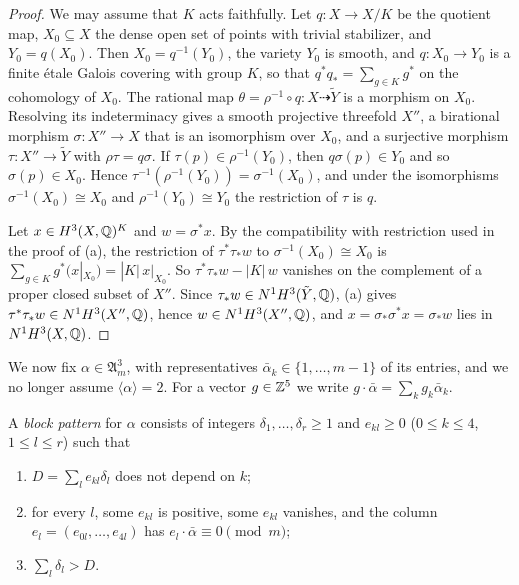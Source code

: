 \begin{proof}
We may assume that $K$ acts faithfully. Let $q\colon X\to X/K$ be the
quotient map, $X_{0}\subseteq X$ the dense open set of points with trivial
stabilizer, and $Y_{0}=q(X_{0})$. Then $X_{0}=q^{-1}(Y_{0})$, the variety
$Y_{0}$ is smooth, and $q\colon X_{0}\to Y_{0}$ is a finite \'etale Galois
covering with group $K$, so that $q^{*}q_{*}=\sum_{g\in K}g^{*}$ on the
cohomology of $X_{0}$. The rational map $\theta=\rho^{-1}\circ q\colon
X\dashrightarrow\tilde Y$ is a morphism on $X_{0}$. Resolving its
indeterminacy \cite{Hir64} gives a smooth projective threefold $X''$, a
birational morphism $\sigma\colon X''\to X$ that is an isomorphism over
$X_{0}$, and a surjective morphism $\tau\colon X''\to\tilde Y$ with
$\rho\tau=q\sigma$. If $\tau(p)\in\rho^{-1}(Y_{0})$, then $q\sigma(p)\in
Y_{0}$ and so $\sigma(p)\in X_{0}$. Hence $\tau^{-1}(\rho^{-1}(Y_{0}))=
\sigma^{-1}(X_{0})$, and under the isomorphisms $\sigma^{-1}(X_{0})\cong
X_{0}$ and $\rho^{-1}(Y_{0})\cong Y_{0}$ the restriction of $\tau$ is $q$.

Let $x\in H^{3}(X,\mathbb{Q})^{K}$ and $w=\sigma^{*}x$. By the compatibility with
restriction used in the proof of (a), the restriction of
$\tau^{*}\tau_{*}w$ to $\sigma^{-1}(X_{0})\cong X_{0}$ is
$\sum_{g\in K}g^{*}(x|_{X_{0}})=|K|\,x|_{X_{0}}$. So $\tau^{*}\tau_{*}w-
|K|\,w$ vanishes on the complement of a proper closed subset of $X''$. Since
$\tau_{*}w\in N^{1}H^{3}(\tilde Y,\mathbb{Q})$, (a) gives
$\tau^{*}\tau_{*}w\in N^{1}H^{3}(X'',\mathbb{Q})$, hence $w\in N^{1}H^{3}(X'',\mathbb{Q})$,
and $x=\sigma_{*}\sigma^{*}x=\sigma_{*}w$ lies in $N^{1}H^{3}(X,\mathbb{Q})$.
\end{proof}

We now fix $\alpha\in\mathfrak A^{3}_{m}$, with representatives
$\bar\alpha_{k}\in\{1,\dots,m-1\}$ of its entries, and we no longer assume
$\langle\alpha\rangle=2$. For a vector $g\in\mathbb{Z}^{5}$ we write $g\cdot
\bar\alpha=\sum_{k}g_{k}\bar\alpha_{k}$.

\begin{definition}\label{def:blockpattern}
A \emph{block pattern} for $\alpha$ consists of integers $\delta_{1},\dots,
\delta_{r}\ge1$ and $e_{kl}\ge0$ ($0\le k\le4$, $1\le l\le r$) such that
\begin{enumerate}[label=\textup{(P\arabic*)}]
\item $D=\sum_{l}e_{kl}\delta_{l}$ does not depend on $k$;
\item for every $l$, some $e_{kl}$ is positive, some $e_{kl}$ vanishes, and
the column $e_{l}=(e_{0l},\dots,e_{4l})$ has $e_{l}\cdot\bar\alpha\equiv0
\pmod m$;
\item $\sum_{l}\delta_{l}>D$.
\end{enumerate}
\end{definition}

